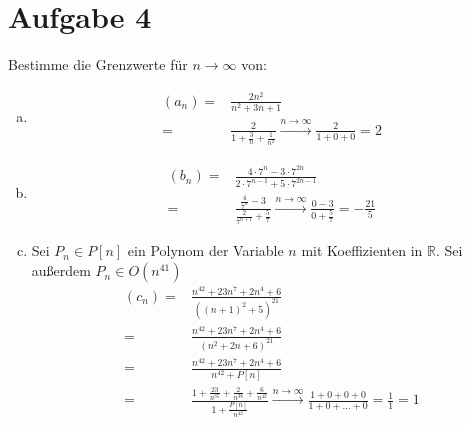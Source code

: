 \documentclass{scrreprt}
\newcommand{\RR}{\mathbb{R}}
\begin{document}
	\section*{Aufgabe 4}
		Bestimme die Grenzwerte für $n \to \infty$ von:
			\begin{enumerate}[(a)]
				\item
					\begin{align*}
						(a_n) =& \frac{2n^2}{n^2 + 3n + 1}\\
						= & \frac{2}{1 + \frac{3}{n} + \frac{1}{n^2}} \xrightarrow{n \to \infty} \frac{2}{1 + 0 + 0} = 2
					\end{align*}
				\item
					\begin{align*}
						(b_n) =& \frac{4 \cdot 7^n  - 3 \cdot 7^{2n}}{2 \cdot 7^{n-1} + 5 \cdot 7^{2n -1}}\\
						= & \frac{\frac{4}{7^n}  - 3 }{\frac{2}{7^{n+1}} + \frac{5}{7}} \xrightarrow{n \to \infty} \frac{0 - 3}{0 + \frac{5}{7}} = -\frac{21}{5}
					\end{align*}
				\item
					Sei $P_n \in P[n]$ ein Polynom der Variable $n$ mit Koeffizienten in $\RR$. Sei außerdem $P_n \in O(n^{41})$
					\begin{align*}
						(c_n) =& \frac{n^{42} + 23n^7 + 2n^4 + 6}{((n+1)^2 + 5)^{21}}\\
						=& \frac{n^{42} + 23n^7 + 2n^4 + 6}{(n^2 + 2n + 6)^{21}}\\
						=& \frac{n^{42} + 23n^7 + 2n^4 + 6}{n^{42} + P[n]}\\
						=& \frac{1 + \frac{23}{n^{35}} + \frac{2}{n^{38}} + \frac{6}{n^{42}}}{1 + \frac{P[n]}{n^{42}}}\xrightarrow{n \to \infty} \frac{1 + 0 + 0 + 0}{1 + 0 + \dots + 0} = \frac{1}{1} = 1
					\end{align*}
			\end{enumerate}

\pagebreak
\end{document}

